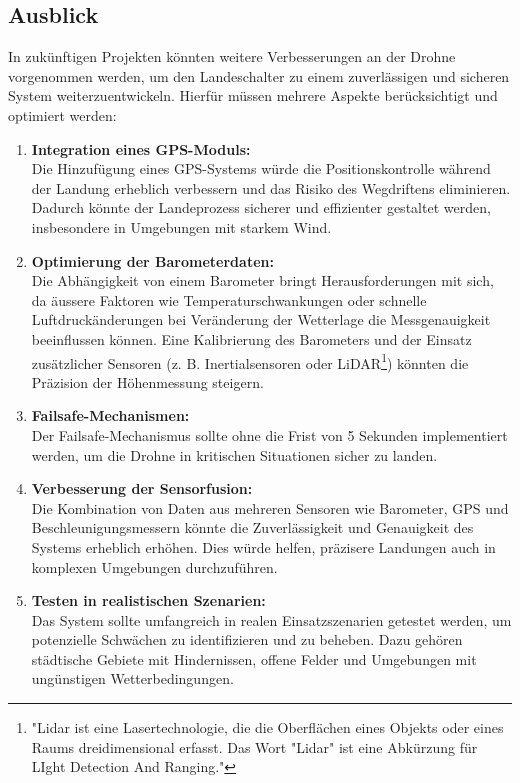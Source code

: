 \subsection{Ausblick}\label{sec:ausblick}
In zukünftigen Projekten könnten weitere Verbesserungen an der Drohne vorgenommen werden, um den Landeschalter zu einem zuverlässigen und sicheren System weiterzuentwickeln. Hierfür müssen mehrere Aspekte berücksichtigt und optimiert werden:
\begin{enumerate}
\item \textbf{Integration eines GPS-Moduls:} \\
Die Hinzufügung eines GPS-Systems würde die Positionskontrolle während der Landung erheblich verbessern und das Risiko des Wegdriftens eliminieren. Dadurch könnte der Landeprozess sicherer und effizienter gestaltet werden, insbesondere in Umgebungen mit starkem Wind.
	
\item \textbf{Optimierung der Barometerdaten:} \\
Die Abhängigkeit von einem Barometer bringt Herausforderungen mit sich, da äussere Faktoren wie Temperaturschwankungen oder schnelle Luftdruckänderungen bei Veränderung der Wetterlage die Messgenauigkeit beeinflussen können. Eine Kalibrierung des Barometers und der Einsatz zusätzlicher Sensoren (z. B. Inertialsensoren oder LiDAR\footnote{"Lidar ist eine Lasertechnologie, die die Oberflächen eines Objekts oder eines Raums dreidimensional erfasst. Das Wort "Lidar" ist eine Abkürzung für LIght Detection And Ranging."\cite{LiDAR}}) könnten die Präzision der Höhenmessung steigern.
	
\item \textbf{Failsafe-Mechanismen:} \\
Der Failsafe-Mechanismus sollte ohne die Frist von 5 Sekunden implementiert werden, um die Drohne in kritischen Situationen sicher zu landen.
	
\item \textbf{Verbesserung der Sensorfusion:} \\
Die Kombination von Daten aus mehreren Sensoren wie Barometer, GPS und Beschleunigungsmessern könnte die Zuverlässigkeit und Genauigkeit des Systems erheblich erhöhen. Dies würde helfen, präzisere Landungen auch in komplexen Umgebungen durchzuführen.
	
\item \textbf{Testen in realistischen Szenarien:} \\
Das System sollte umfangreich in realen Einsatzszenarien getestet werden, um potenzielle Schwächen zu identifizieren und zu beheben. Dazu gehören städtische Gebiete mit Hindernissen, offene Felder und Umgebungen mit ungünstigen Wetterbedingungen.
\end{enumerate}



